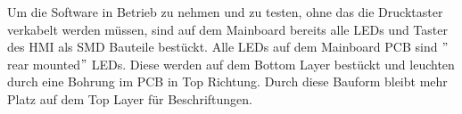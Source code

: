  Um die Software in Betrieb zu nehmen und zu testen, ohne das die Drucktaster verkabelt werden müssen, sind auf dem Mainboard bereits alle LEDs und Taster des HMI als SMD Bauteile bestückt. Alle LEDs auf dem Mainboard PCB sind $"$rear mounted$"$ LEDs. Diese werden auf dem Bottom Layer bestückt und leuchten durch eine Bohrung im PCB in Top Richtung. Durch diese Bauform bleibt mehr Platz auf dem Top Layer für Beschriftungen.




